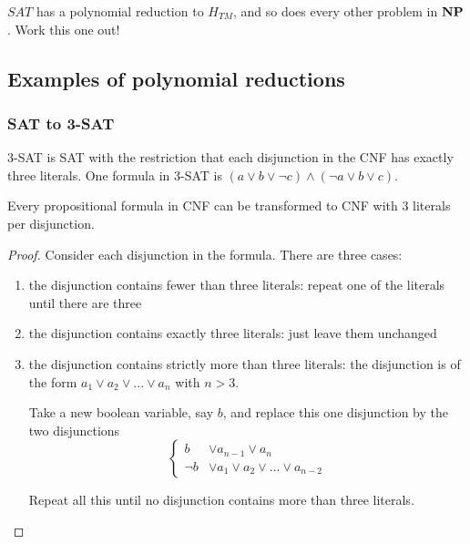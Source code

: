 \begin{exercise}
$SAT$ has a polynomial reduction to $H_{TM}$,
and so does every other problem in ${\bf NP}$. Work this one out!
\end{exercise}


\subsection{Examples of polynomial reductions}

\subsubsection{SAT to 3-SAT}

3-SAT is SAT with the restriction that each disjunction in the CNF has
exactly three literals. One formula in 3-SAT is
%
$(a \vee b \vee \neg c) \wedge (\neg a \vee b \vee c)$.

\begin{theorem}
Every propositional formula in CNF can be transformed to CNF with 3 literals per disjunction.
\end{theorem}
\begin{proof}
Consider each disjunction in the formula. There are three cases:
\begin{enumerate}
\item
the disjunction contains fewer than three literals: repeat one of the
literals until there are three
\item
the disjunction contains exactly three literals: just leave them
unchanged
\item
the disjunction contains strictly more than three literals: the
disjunction is of the form
%
$a_1 \vee a_2 \vee  ... \vee a_n$ with $n > 3$.

Take a new boolean variable, say $b$, and replace this one disjunction
by the two disjunctions
\begin{equation*}
	\left\{\begin{aligned}
		b &\vee a_{n-1} \vee a_n \\
		\neg b &\vee a_1 \vee a_2 \vee  ... \vee a_{n-2}
	\end{aligned}\right.
\end{equation*}

Repeat all this until no disjunction contains more than three literals.\vspace{-1.75em}
\end{enumerate}
\end{proof}

